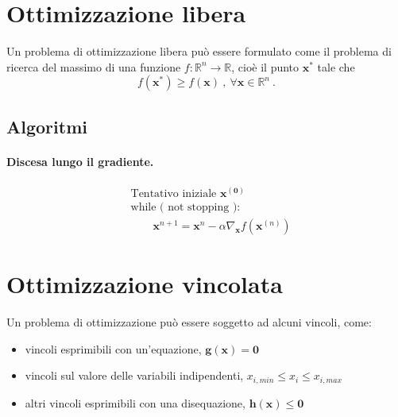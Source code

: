 \section{Ottimizzazione libera}
Un problema di ottimizzazione libera può essere formulato come il problema di ricerca del massimo di una funzione $f: \mathbb{R}^n \rightarrow \mathbb{R}$, cioè il punto $\mathbf{x}^*$ tale che
\begin{equation}
  f(\mathbf{x}^*) \ge f(\mathbf{x}) \ , \ \forall \mathbf{x} \in \mathbb{R}^n \ .
\end{equation}

\subsection{Algoritmi}
\paragraph{Discesa lungo il gradiente.}
\begin{equation}
    \begin{aligned}
        & \text{Tentativo iniziale $\mathbf{x^{(0)}}$ } \\
        & \text{while \ ( \ not stopping \ ):} \\
        & \qquad \mathbf{x}^{n+1} = \mathbf{x}^n - \alpha \nabla_\mathbf{x} f(\mathbf{x}^{(n)})
    \end{aligned}
\end{equation}

\section{Ottimizzazione vincolata}
Un problema di ottimizzazione può essere soggetto ad alcuni vincoli, come:
\begin{itemize}
    \item vincoli esprimibili con un'equazione, $\mathbf{g}(\mathbf{x}) = \mathbf{0}$
    \item vincoli sul valore delle variabili indipendenti, $x_{i,min} \le x_i \le x_{i,max}$
    \item altri vincoli esprimibili con una disequazione,  $\mathbf{h}(\mathbf{x}) \le \mathbf{0}$
\end{itemize}



